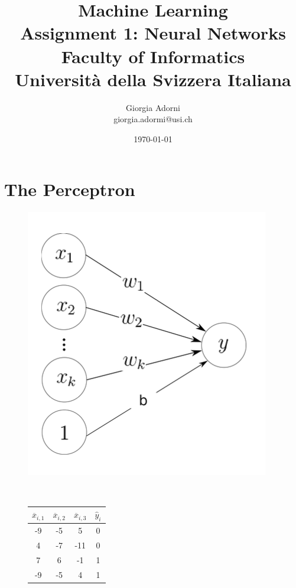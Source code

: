 \documentclass[12pt]{article}
\title{Machine Learning \\ \Large{Assignment 1: Neural Networks} \\[0.3em] \normalsize{Faculty of Informatics} \\ \normalsize{Università della Svizzera Italiana}}
\author {{Giorgia Adorni}	\\ \normalsize{giorgia.adormi@usi.ch}}
\date{\today}
\begin{document}
 


\maketitle 

\section{The Perceptron}
\begin{figure}[h!]
	
	\begin{minipage}[c]{.49\textwidth}
		\centering
		\includegraphics[width=.7\linewidth]{neuron.png}
		\label{fig:perceptron}
	\end{minipage}
	~
	\begin{minipage}[c]{.49\textwidth}
		\centering
			\begin{tabular}{|c|c|c|c|}
				\hline
				$\overline{x}_{i,1}$ & $\overline{x}_{i,2}$ & $\overline{x}_{i,3}$ & $\hat{y}_i$ \\\hline
				-9         & -5         & 5          & 0                           \\\hline
				4          & -7         & -11        & 0                           \\\hline
				7          & 6          & -1         & 1                           \\\hline
				-9         & -5         & 4          & 1                           \\\hline

\end{tabular}
\end{minipage}
\end{figure}
\end{document}
